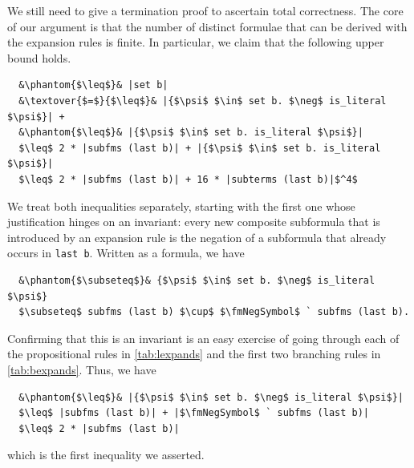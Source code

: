 \documentclass[runningheads]{llncs}
\newcommand{\textover}[3][l]{%
 \makebox[\widthof{#3}][#1]{#2}%
}
\newcommand{\fmNegSymbol}{\boldsymbol{\neg}}
\begin{document}
We still need to give a termination proof to ascertain total correctness.
The core of our argument is that the number of distinct formulae that can be derived with the expansion rules is finite.
In particular, we claim that the following upper bound holds.
\begin{lstlisting}
  &\phantom{$\leq$}& |set b|
  &\textover{$=$}{$\leq$}& |{$\psi$ $\in$ set b. $\neg$ is_literal $\psi$}| +
  &\phantom{$\leq$}& |{$\psi$ $\in$ set b. is_literal $\psi$}|
  $\leq$ 2 * |subfms (last b)| + |{$\psi$ $\in$ set b. is_literal $\psi$}|
  $\leq$ 2 * |subfms (last b)| + 16 * |subterms (last b)|$^4$
\end{lstlisting}
We treat both inequalities separately, starting with the first one whose justification hinges on an invariant: 
every new composite subformula that is introduced by an expansion rule is the negation of a subformula that already occurs in \lstinline!last b!.
Written as a formula, we have
\begin{lstlisting}
  &\phantom{$\subseteq$}& {$\psi$ $\in$ set b. $\neg$ is_literal $\psi$}
  $\subseteq$ subfms (last b) $\cup$ $\fmNegSymbol$ ` subfms (last b).
\end{lstlisting}
Confirming that this is an invariant is an easy exercise of going through each of the propositional rules in \autoref{tab:lexpands} and the first two branching rules in \autoref{tab:bexpands}.
Thus, we have
\begin{lstlisting}
  &\phantom{$\leq$}& |{$\psi$ $\in$ set b. $\neg$ is_literal $\psi$}|
  $\leq$ |subfms (last b)| + |$\fmNegSymbol$ ` subfms (last b)|
  $\leq$ 2 * |subfms (last b)|
\end{lstlisting}
which is the first inequality we asserted. 
\end{document}
